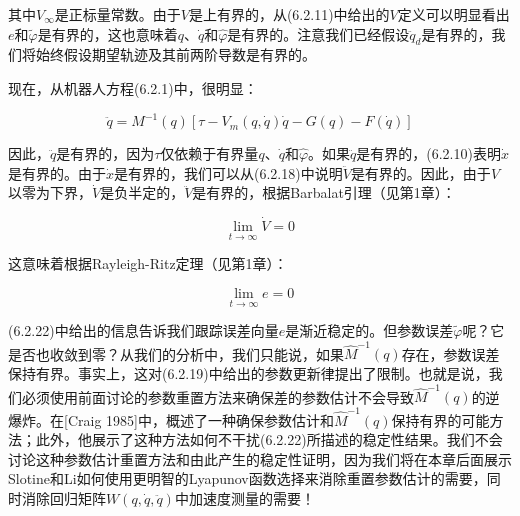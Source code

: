 \documentclass[12pt,a4paper]{ctexart}
\begin{document}
其中$V_\infty$是正标量常数。由于$V$是上有界的，从(6.2.11)中给出的$V$定义可以明显看出$e$和$\tilde{\varphi}$是有界的，这也意味着$q$、$\dot{q}$和$\hat{\varphi}$是有界的。注意我们已经假设$\ddot{q}_d$是有界的，我们将始终假设期望轨迹及其前两阶导数是有界的。

现在，从机器人方程(6.2.1)中，很明显：

\begin{equation}
\ddot{q} = M^{-1}(q)[\tau - V_m(q, \dot{q})\dot{q} - G(q) - F(\dot{q})]
\end{equation}

因此，$\ddot{q}$是有界的，因为$\tau$仅依赖于有界量$q$、$\dot{q}$和$\hat{\varphi}$。如果$\ddot{q}$是有界的，(6.2.10)表明$\dot{x}$是有界的。由于$\dot{x}$是有界的，我们可以从(6.2.18)中说明$\ddot{V}$是有界的。因此，由于$V$以零为下界，$\dot{V}$是负半定的，$\ddot{V}$是有界的，根据Barbalat引理（见第1章）：

\begin{equation}
\lim_{t \to \infty} \dot{V} = 0
\end{equation}

这意味着根据Rayleigh-Ritz定理（见第1章）：

\begin{equation}\label{eq:asymptotic-stability}
\lim_{t \to \infty} e = 0
\end{equation}

(6.2.22)中给出的信息告诉我们跟踪误差向量$e$是渐近稳定的。但参数误差$\tilde{\varphi}$呢？它是否也收敛到零？从我们的分析中，我们只能说，如果$\hat{M}^{-1}(q)$存在，参数误差保持有界。事实上，这对(6.2.19)中给出的参数更新律提出了限制。也就是说，我们必须使用前面讨论的参数重置方法来确保差的参数估计不会导致$\hat{M}^{-1}(q)$的逆爆炸。在[Craig 1985]中，概述了一种确保参数估计和$\hat{M}^{-1}(q)$保持有界的可能方法；此外，他展示了这种方法如何不干扰(6.2.22)所描述的稳定性结果。我们不会讨论这种参数估计重置方法和由此产生的稳定性证明，因为我们将在本章后面展示Slotine和Li如何使用更明智的Lyapunov函数选择来消除重置参数估计的需要，同时消除回归矩阵$W(q, \dot{q}, \ddot{q})$中加速度测量的需要！
\end{document}
